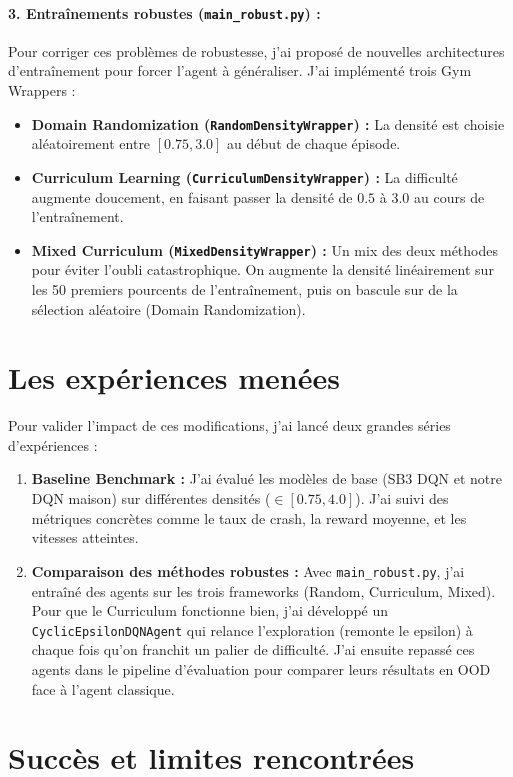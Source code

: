 \documentclass[11pt,a4paper]{article}
\begin{document}
\paragraph{3. Entraînements robustes (\texttt{main\_robust.py}) :}
Pour corriger ces problèmes de robustesse, j'ai proposé de nouvelles architectures d'entraînement pour forcer l'agent à généraliser. J'ai implémenté trois Gym Wrappers :
\begin{itemize}
    \item \textbf{Domain Randomization (\texttt{RandomDensityWrapper}) :} La densité est choisie aléatoirement entre $[0.75, 3.0]$ au début de chaque épisode.
    \item \textbf{Curriculum Learning (\texttt{CurriculumDensityWrapper}) :} La difficulté augmente doucement, en faisant passer la densité de $0.5$ à $3.0$ au cours de l'entraînement.
    \item \textbf{Mixed Curriculum (\texttt{MixedDensityWrapper}) :} Un mix des deux méthodes pour éviter l'oubli catastrophique. On augmente la densité linéairement sur les 50 premiers pourcents de l'entraînement, puis on bascule sur de la sélection aléatoire (Domain Randomization).
\end{itemize}

\section{Les expériences menées}

Pour valider l'impact de ces modifications, j'ai lancé deux grandes séries d'expériences :
\begin{enumerate}
    \item \textbf{Baseline Benchmark :} J'ai évalué les modèles de base (SB3 DQN et notre DQN maison) sur différentes densités ($\in [0.75, 4.0]$). J'ai suivi des métriques concrètes comme le taux de crash, la reward moyenne, et les vitesses atteintes.
    \item \textbf{Comparaison des méthodes robustes :} Avec \texttt{main\_robust.py}, j'ai entraîné des agents sur les trois frameworks (Random, Curriculum, Mixed). Pour que le Curriculum fonctionne bien, j'ai développé un \texttt{CyclicEpsilonDQNAgent} qui relance l'exploration (remonte le epsilon) à chaque fois qu'on franchit un palier de difficulté. J'ai ensuite repassé ces agents dans le pipeline d'évaluation pour comparer leurs résultats en OOD face à l'agent classique.
\end{enumerate}

\section{Succès et limites rencontrées}
\end{document}
